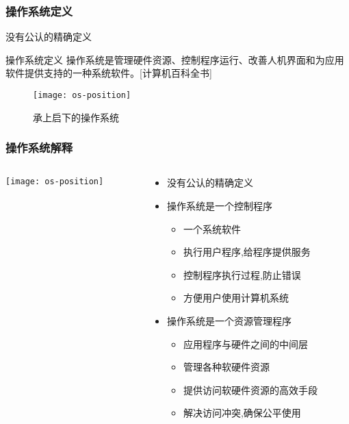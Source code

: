 \begin{frame}[plain]

\frametitle{操作系统定义}


没有公认的精确定义 \pause

\begin{block}{操作系统定义}
操作系统是管理硬件资源、控制程序运行、改善人机界面和为应用软件提供支持的一种系统软件。[计算机百科全书]
\end{block} \pause


\begin{figure}
	\centering
	\texttt{[image: os-position]}
	\caption{承上启下的操作系统}
\end{figure}

\end{frame}


\begin{frame}

\frametitle{操作系统解释}

\begin{columns}

\begin{column}{.55\linewidth}

	\texttt{[image: os-position]}

\end{column}

\begin{column}{0.7\linewidth}
	
\begin{itemize}
\item 没有公认的精确定义 \pause
\item 操作系统是一个控制程序
	\begin{itemize}
	\item 一个系统软件
	\item 执行用户程序,给程序提供服务
	\item 控制程序执行过程,防止错误
	\item 方便用户使用计算机系统
	\end{itemize}
	\pause
	\item 操作系统是一个资源管理程序
	\begin{itemize}
		\item 应用程序与硬件之间的中间层
		\item 管理各种软硬件资源
		\item 提供访问软硬件资源的高效手段
		\item 解决访问冲突,确保公平使用
	\end{itemize}
\end{itemize}

\end{column}

\end{columns}

\end{frame}


